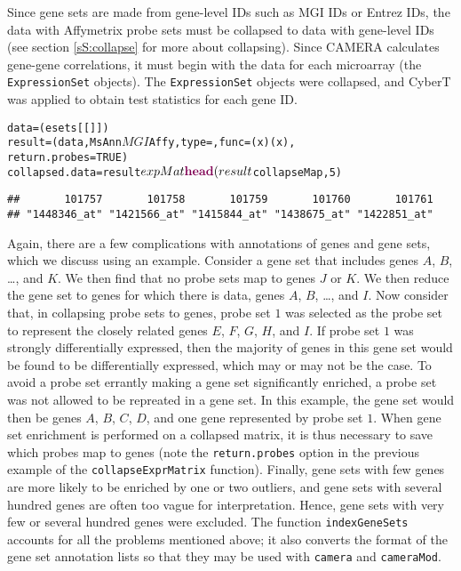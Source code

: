 Since gene sets are made from gene-level IDs such as MGI IDs or 
Entrez IDs, the data with Affymetrix probe sets must be collapsed
to data with gene-level IDs (see section \ref{sS:collapse} for more about collapsing).
Since CAMERA calculates gene-gene correlations, it must begin with
the data for each microarray (the \texttt{ExpressionSet} objects). The
\texttt{ExpressionSet} objects were collapsed, and CyberT was applied to obtain
test statistics for each gene ID.

\singlespacing
\begin{knitrout}
\color{fgcolor}\begin{kframe}
\begin{alltt}
data = (esets[[]])
result = (data, MsAnn$MGI$Affy, type = , func = (x) (x), 
    return.probes = TRUE)
collapsed.data = result$expMat
\hlfunctioncall{head}(result$collapseMap, 5)
\end{alltt}
\begin{verbatim}
##       101757       101758       101759       101760       101761 
## "1448346_at" "1421566_at" "1415844_at" "1438675_at" "1422851_at"
\end{verbatim}
\end{kframe}
\end{knitrout}
\doublespacing

Again, there are a few complications with annotations of genes and gene sets, which
we discuss using an example. Consider a gene set that includes genes $A$, $B$, \ldots , and $K$.
We then find that no probe sets map to genes $J$ or $K$. We then reduce the gene set to genes
for which there is data, genes $A$, $B$, \ldots , and $I$. Now consider that,
in collapsing probe sets to genes,  probe set $1$ was selected as the probe set
to represent the closely related genes $E$, $F$, $G$, $H$, and $I$. If probe set $1$
was strongly differentially expressed, then the majority of genes in this
gene set would be found to be differentially expressed, which may or may not
be the case. To avoid a probe set errantly making a gene set
significantly enriched, a probe set was not allowed to be repreated in a  gene set. 
In this example, the gene
set would then be genes $A$, $B$, $C$, $D$, and one gene represented by probe set $1$.
When gene set enrichment is performed on a collapsed matrix, it is thus necessary
to save which probes map to genes (note the \texttt{return.probes} option in the
previous example of the \texttt{collapseExprMatrix} function). Finally, gene sets with
few genes are more likely to be enriched by one or two outliers, and
gene sets with several hundred genes are often too vague for interpretation. Hence,
gene sets with very few or several hundred genes were excluded. The function
\texttt{indexGeneSets} accounts for all the problems mentioned above; it also
converts the format of the gene set annotation lists so that they may be
used with \texttt{camera} and \texttt{cameraMod}.

